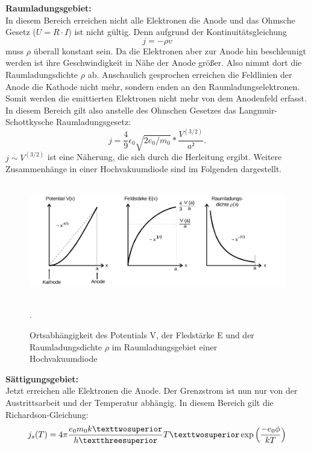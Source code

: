 \textbf{Raumladungsgebiet:}\\
In diesem Bereich erreichen nicht alle Elektronen die Anode und das Ohmsche Gesetz
($U=R\cdot I$) ist nicht gültig. Denn aufgrund der Kontinuitätsgleichung
\begin{equation}
  j=  -\rho v
\end{equation}
muss $\rho$ überall konstant sein. Da die Elektronen aber zur Anode hin beschleunigt werden
ist ihre Geschwindigkeit in Nähe der Anode größer. Also nimmt dort die Raumladungsdichte
$\rho$ ab. Anschaulich gesprochen erreichen die Feldlinien der Anode die Kathode nicht mehr,
sondern enden an den Raumladungselektronen. Somit werden die emittierten Elektronen
nicht mehr von dem Anodenfeld erfasst.
In diesem Bereich gilt also anstelle des Ohnschen Gesetzes das
Langmuir-Schottkysche Raumladungsgesetz:
\begin{equation}
  j=\frac{4}{9}\epsilon_{0}\sqrt{2e_{0}/m_{0}}*\frac{V^{(3/2)}}{a²}.
  \label{eqn:lang}
\end{equation}
$j \sim V^{(3/2)}$ ist eine Näherung, die sich durch die Herleitung ergibt.
 Weitere Zusammenhänge in einer Hochvakuumdiode sind im Folgenden dargestellt.
 \begin{figure}[H]
   \centering
   \includegraphics[height=5cm]{diagramm.png}
   \caption{Ortsabhängigkeit des Potentials V, der Fledstärke E und der Raumladungsdichte $\rho$
   im Raumladungsgebiet einer Hochvakuumdiode}
   \label{fig:diagramm}
   \cite{skript}.
 \end{figure}

\textbf{Sättigungsgebiet:}\\
Jetzt erreichen alle Elektronen die Anode. Der Grenzstrom ist nun nur von der
Austrittsarbeit und der Temperatur abhängig. In diesem Bereich gilt die
Richardson-Gleichung:
\begin{equation}
  j_{s}(T)= 4 \pi \frac{e_{0}m_{0}k²}{h³}T²\exp{\Bigl(\frac{-e_{0}\phi}{kT}\Bigr)}
  \label{eqn:satt}
\end{equation}
\label{sec:Theorie}
